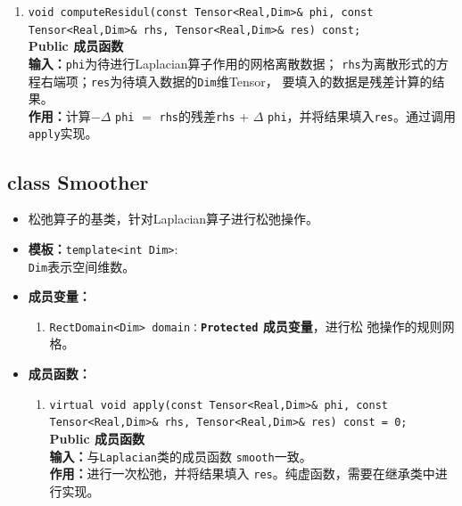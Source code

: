 \documentclass[a4paper,twoside]{ctexart}
\begin{document}
\begin{itemize}
\begin{enumerate}[(1)]
            \item \texttt{void computeResidul(const Tensor<Real,Dim>\& phi, const Tensor<Real,Dim>\&
                      rhs, Tensor<Real,Dim>\& res) const;}\\
              \textbf{Public 成员函数}\\
            \textbf{输入：}\texttt{phi}为待进行Laplacian算子作用的网格离散数据；
            \texttt{rhs}为离散形式的方程右端项；\texttt{res}为待填入数据的\texttt{Dim}维Tensor，
            要填入的数据是残差计算的结果。\\
            \textbf{作用：}计算$-\Delta$ \texttt{phi} $=$
            \texttt{rhs}的残差\texttt{rhs} + $\Delta$ \texttt{phi}，并将结果填入\texttt{res}。通过调用
            \texttt{apply}实现。
        \end{enumerate}
      \end{itemize}
\subsection*{class Smoother}
\begin{itemize}
    \item 松弛算子的基类，针对Laplacian算子进行松弛操作。
    \item \textbf{模板：}\texttt{template<int Dim>}:\\
    \texttt{Dim}表示空间维数。
     \item \textbf{成员变量：}
        \begin{enumerate}[(1)]
            \item \texttt{RectDomain<Dim>
                domain：}\textbf{\texttt{Protected}  成员变量}，进行松
              弛操作的规则网格。
        \end{enumerate}
    \item \textbf{成员函数：}
        \begin{enumerate}[(1)]
            \item \texttt{virtual void apply(const Tensor<Real,Dim>\& phi, const Tensor<Real,Dim>\&
                     rhs, Tensor<Real,Dim>\& res) const = 0;}\\
              \textbf{Public 成员函数}\\
            \textbf{输入：}与\texttt{Laplacian}类的成员函数
            \texttt{smooth}一致。\\
            \textbf{作用：}进行一次松弛，并将结果填入
            \texttt{res}。纯虚函数，需要在继承类中进行实现。
        \end{enumerate}
      \end{itemize}
\end{document}
